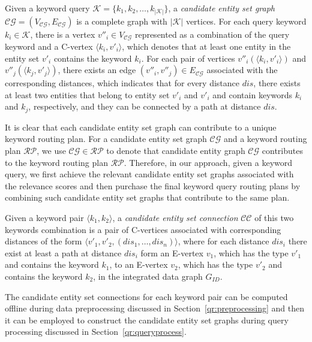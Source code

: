\begin{definition}\label{CG} Given a keyword query $\mathcal{K} =
\{k_1,k_2,\ldots,k_{\left\vert\mathcal{K}\right\vert}\}$, a \emph{candidate entity set graph}
$\mathcal{CG} = (V_{\mathcal{CG}},E_{\mathcal{CG}})$ is a complete graph with
$\left\vert\mathcal{K}\right\vert$ vertices. For each query keyword $k_i \in \mathcal{K}$, there is a
vertex $v''_i \in V_{\mathcal{CG}}$ represented as a combination of the query keyword and a C-vertex
$\langle k_i,v'_i \rangle$, which denotes that at least one entity in the entity set $v'_i$ contains
the keyword $k_i$. For each pair of vertices $v''_i(\langle k_i,v'_i \rangle)$ and $v''_j(\langle
k_j,v'_j \rangle)$, there exists an edge $(v''_i,v''_j) \in E_{\mathcal{CG}}$ associated with the
corresponding distances, which indicates that for every distance $dis$, there exists at least two
entities that belong to entity set $v'_i$ and $v'_i$ and contain keywords $k_i$ and $k_j$,
respectively, and they can be connected by a path at distance $dis$.
\end{definition}

It is clear that each candidate entity set graph can contribute to a unique keyword routing plan.
For a candidate entity set graph $\mathcal{CG}$ and a keyword routing plan $\mathcal{RP}$, we use
$\mathcal{CG} \in \mathcal{RP}$ to denote that candidate entity graph $\mathcal{CG}$ contributes to
the keyword routing plan $\mathcal{RP}$. Therefore, in our approach, given a keyword query, we first
achieve the relevant candidate entity set graphs associated with the relevance scores and then
purchase the final keyword query routing plans by combining such candidate entity set graphs that
contribute to the same plan.

\begin{definition} Given a keyword pair $\langle k_1,k_2\rangle$, a
\emph{candidate entity set connection} $\mathcal{CC}$ of this two keywords combination is a pair of
C-vertices associated with corresponding distances of the form $\langle
v'_1,v'_2,(dis_1,\ldots,dis_n)\rangle$, where for each distance $dis_i$ there exist at least a path
at distance $dis_i$ form an E-vertex $v_1$, which has the type $v'_1$ and contains the keyword $k_1$,
to an E-vertex $v_2$, which has the type $v'_2$ and contains the keyword $k_2$, in the integrated
data graph $G_{ID}$.
\end{definition}

The candidate entity set connections for each keyword pair can be computed offline during data
preprocessing discussed in Section~\ref{qr:preprocessing} and then it can be employed to construct
the candidate entity set graphs during query processing discussed in Section~\ref{qr:queryprocess}.


